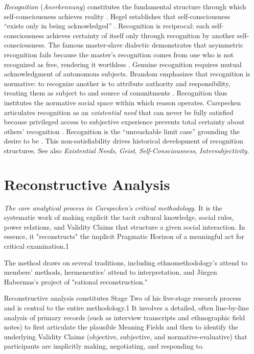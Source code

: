 \documentclass{book}
\begin{document}
\textit{Recognition} (\textit{Anerkennung}) constitutes the fundamental structure through which self-consciousness achieves reality \parencite{hegel1977phenomenology}. Hegel establishes that self-consciousness ``exists only in being acknowledged'' \parencite[\S 178]{hegel1977phenomenology}. Recognition is reciprocal: each self-consciousness achieves certainty of itself only through recognition by another self-consciousness. The famous master-slave dialectic demonstrates that asymmetric recognition fails because the master's recognition comes from one who is not recognized as free, rendering it worthless \parencite{hegel1977phenomenology}. Genuine recognition requires mutual acknowledgment of autonomous subjects. Brandom emphasizes that recognition is normative: to recognize another is to attribute authority and responsibility, treating them as subject to and source of commitments \parencite{Brandom:2019aa}. Recognition thus institutes the normative social space within which reason operates. Carspecken articulates recognition as an \textit{existential need} that can never be fully satisfied because privileged access to subjective experience prevents total certainty about others' recognition \parencite{Carspecken1999}. Recognition is the ``unreachable limit case'' grounding the desire to be \parencite{carspecken_limits_2016}. This non-satisfiability drives historical development of recognition structures. See also \textit{Existential Needs}, \textit{Geist}, \textit{Self-Consciousness}, \textit{Intersubjectivity}.


\section{Reconstructive Analysis}

\textit{The core analytical process in Carspecken's critical methodology.} It is the systematic work of making explicit the tacit cultural knowledge, social rules, power relations, and Validity Claims that structure a given social interaction. In essence, it "reconstructs" the implicit Pragmatic Horizon of a meaningful act for critical examination.1

The method draws on several traditions, including ethnomethodology's attend to members' methods, hermeneutics' attend to interpretation, and Jürgen Habermas's project of "rational reconstruction."

Reconstructive analysis constitutes Stage Two of his five-stage research process and is central to the entire methodology.1 It involves a detailed, often line-by-line analysis of primary records (such as interview transcripts and ethnographic field notes) to first articulate the plausible Meaning Fields and then to identify the underlying Validity Claims (objective, subjective, and normative-evaluative) that participants are implicitly making, negotiating, and responding to.
\end{document}
